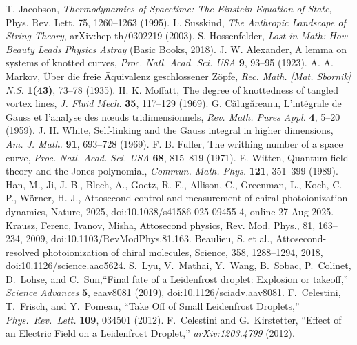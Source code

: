 \documentclass[10pt,reprint,aps,onecolumn,nofootinbib]{revtex4-2}
\begin{document}
\begin{thebibliography}{99}
     T. Jacobson, \emph{Thermodynamics of Spacetime: The Einstein Equation of State}, Phys. Rev. Lett. 75, 1260–1263 (1995).
     L. Susskind, \emph{The Anthropic Landscape of String Theory}, arXiv:hep-th/0302219 (2003).
     S. Hossenfelder, \emph{Lost in Math: How Beauty Leads Physics Astray} (Basic Books, 2018).
     J. W. Alexander, A lemma on systems of knotted curves, \emph{Proc. Natl. Acad. Sci. USA} \textbf{9}, 93–95 (1923).
     A. A. Markov, Über die freie Äquivalenz geschlossener Zöpfe, \emph{Rec. Math. [Mat. Sbornik] N.S.} \textbf{1(43)}, 73–78 (1935).
     H. K. Moffatt, The degree of knottedness of tangled vortex lines, \emph{J. Fluid Mech.} \textbf{35}, 117–129 (1969).
     G. Călugăreanu, L’intégrale de Gauss et l’analyse des nœuds tridimensionnels, \emph{Rev. Math. Pures Appl.} \textbf{4}, 5–20 (1959).
     J. H. White, Self-linking and the Gauss integral in higher dimensions, \emph{Am. J. Math.} \textbf{91}, 693–728 (1969).
     F. B. Fuller, The writhing number of a space curve, \emph{Proc. Natl. Acad. Sci. USA} \textbf{68}, 815–819 (1971).
     E. Witten, Quantum field theory and the Jones polynomial, \emph{Commun. Math. Phys.} \textbf{121}, 351–399 (1989).
     Han, M., Ji, J.-B., Blech, A., Goetz, R. E., Allison, C., Greenman, L., Koch, C. P., W\"orner, H. J., Attosecond control and measurement of chiral photoionization dynamics, Nature, 2025, doi:10.1038/s41586-025-09455-4, online 27 Aug 2025.
     Krausz, Ferenc, Ivanov, Misha, Attosecond physics, Rev. Mod. Phys., 81, 163--234, 2009, doi:10.1103/RevModPhys.81.163.
     Beaulieu, S. et al., Attosecond-resolved photoionization of chiral molecules, Science, 358, 1288--1294, 2018, doi:10.1126/science.aao5624.
     S.~Lyu, V.~Mathai, Y.~Wang, B.~Sobac, P.~Colinet, D.~Lohse, and C.~Sun,``Final fate of a Leidenfrost droplet: Explosion or takeoff,'' \emph{Science Advances} \textbf{5}, eaav8081 (2019), \href{https://doi.org/10.1126/sciadv.aav8081}{doi:10.1126/sciadv.aav8081}.
     F.~Celestini, T.~Frisch, and Y.~Pomeau, ``Take Off of Small Leidenfrost Droplets,'' \emph{Phys.\ Rev.\ Lett.} \textbf{109}, 034501 (2012).
     F.~Celestini and G.~Kirstetter, ``Effect of an Electric Field on a Leidenfrost Droplet,'' \emph{arXiv:1203.4799} (2012).

\end{thebibliography}
\end{document}

